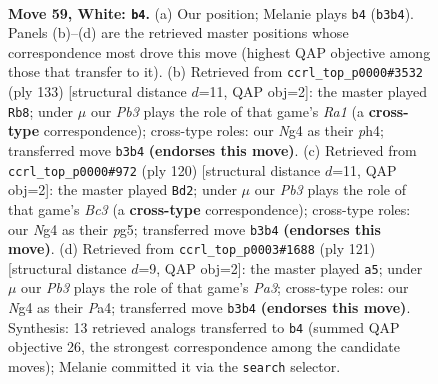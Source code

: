 \documentclass[11pt]{article}
\begin{document}
\clearpage

\begin{figure}[p]\centering
\begin{subfigure}{0.46\textwidth}\centering
\resizebox{\linewidth}{!}{%
\newchessgame
\chessboard[
  setfen={8/kb6/8/8/P2p2N1/1P4n1/8/1K6 w - - 0 59},
  showmover=false,
  pgfstyle=straightmove, color=movearrow, markmove={b3-b4}
]}
\caption{}
\end{subfigure}\hfill
\begin{subfigure}{0.46\textwidth}\centering
\resizebox{\linewidth}{!}{%
\newchessgame
\chessboard[
  setfen={r7/7k/8/7p/7P/8/3B4/3K4 b - - 33 67},
  showmover=false,
  pgfstyle=straightmove, color=movearrow, markmove={a8-b8}
]}
\caption{}
\end{subfigure}
\\[4pt]
\begin{subfigure}{0.46\textwidth}\centering
\resizebox{\linewidth}{!}{%
\newchessgame
\chessboard[
  setfen={8/8/kb6/3K2p1/8/2B4P/8/8 w - - 0 61},
  showmover=false,
  pgfstyle=straightmove, color=movearrow, markmove={c3-d2}
]}
\caption{}
\end{subfigure}\hfill
\begin{subfigure}{0.46\textwidth}\centering
\resizebox{\linewidth}{!}{%
\newchessgame
\chessboard[
  setfen={8/8/p3K3/4B1k1/p7/P7/8/8 b - - 16 61},
  showmover=false,
  pgfstyle=straightmove, color=movearrow, markmove={a6-a5}
]}
\caption{}
\end{subfigure}
\caption{\textbf{Move 59, White: \texttt{b4}.} (a) Our position; Melanie plays \texttt{b4} (\texttt{b3b4}). Panels (b)--(d) are the retrieved master positions whose correspondence most drove this move (highest QAP objective among those that transfer to it). (b) Retrieved from \texttt{ccrl\_top\_p0000\#3532} (ply 133) [structural distance $d$=11, QAP obj=2]: the master played \texttt{Rb8}; under $\mu$ our \emph{Pb3} plays the role of that game's \emph{Ra1} (a \textbf{cross-type} correspondence); cross-type roles: our \emph{N}g4 as their \emph{p}h4; transferred move \texttt{b3b4} \textbf{(endorses this move)}. (c) Retrieved from \texttt{ccrl\_top\_p0000\#972} (ply 120) [structural distance $d$=11, QAP obj=2]: the master played \texttt{Bd2}; under $\mu$ our \emph{Pb3} plays the role of that game's \emph{Bc3} (a \textbf{cross-type} correspondence); cross-type roles: our \emph{N}g4 as their \emph{p}g5; transferred move \texttt{b3b4} \textbf{(endorses this move)}. (d) Retrieved from \texttt{ccrl\_top\_p0003\#1688} (ply 121) [structural distance $d$=9, QAP obj=2]: the master played \texttt{a5}; under $\mu$ our \emph{Pb3} plays the role of that game's \emph{Pa3}; cross-type roles: our \emph{N}g4 as their \emph{P}a4; transferred move \texttt{b3b4} \textbf{(endorses this move)}. Synthesis: 13 retrieved analogs transferred to \texttt{b4} (summed QAP objective 26, the strongest correspondence among the candidate moves); Melanie committed it via the \texttt{search} selector.}
\label{fig:thought-m116}
\end{figure}
\end{document}
